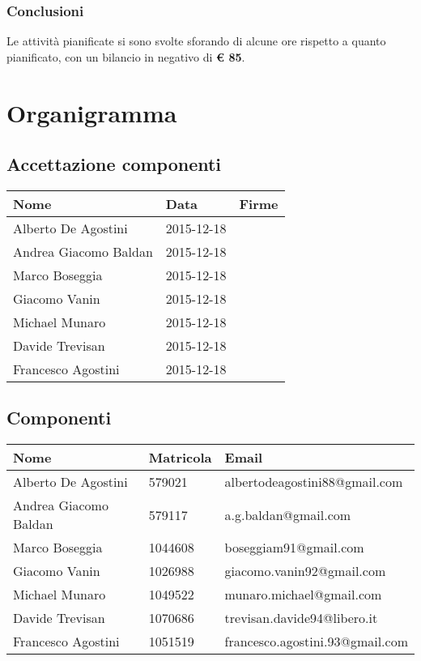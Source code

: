 \documentclass{scalatekids-article}
\begin{document}
\subsubsection{Conclusioni}
Le attività pianificate si sono svolte sforando di alcune ore rispetto a quanto pianificato, con un
bilancio in negativo di \textbf{\euro{} 85}.
\section{Organigramma}
\subsection{Accettazione componenti}
\begin{center}
  \begin{tabular}{|l | l | p{4cm} |}
    \hline
    Nome & Data & Firme \\
    \hline
    Alberto De Agostini & 2015-12-18 &\\
    Andrea Giacomo Baldan & 2015-12-18 &\\
    Marco Boseggia & 2015-12-18 &\\
    Giacomo Vanin & 2015-12-18 &\\
    Michael Munaro & 2015-12-18 &\\
    Davide Trevisan & 2015-12-18 &\\
    Francesco Agostini & 2015-12-18 &\\
    \hline
  \end{tabular}
\end{center}
\subsection{Componenti}
\begin{center}
  \begin{tabular}{|l | l | l |}
    \hline
    Nome & Matricola & Email \\
    \hline
    Alberto De Agostini & 579021 & albertodeagostini88@gmail.com\\
    Andrea Giacomo Baldan & 579117 & a.g.baldan@gmail.com\\
    Marco Boseggia & 1044608 & boseggiam91@gmail.com\\
    Giacomo Vanin & 1026988 & giacomo.vanin92@gmail.com\\
    Michael Munaro & 1049522 & munaro.michael@gmail.com\\
    Davide Trevisan & 1070686 & trevisan.davide94@libero.it\\
    Francesco Agostini & 1051519 & francesco.agostini.93@gmail.com\\
    \hline
  \end{tabular}
\end{center}
\end{document}
